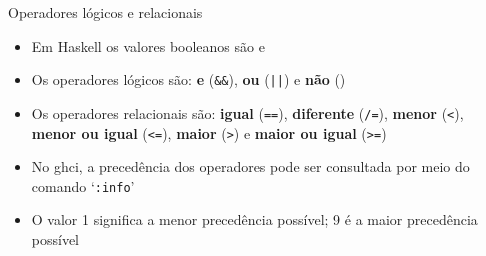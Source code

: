 \begin{frame}[fragile]{Operadores lógicos e relacionais}

    \begin{itemize}
        \item Em Haskell os valores booleanos são  e 

        \item Os operadores lógicos são: \textbf{e} (\texttt{\&\&}), \textbf{ou} (\texttt{||}) e
            \textbf{não} ()

        \item Os operadores relacionais são: \textbf{igual} (\texttt{==}), \textbf{diferente}
            (\texttt{/=}), \textbf{menor} (\texttt{<}), \textbf{menor ou igual} (\texttt{<=}),
            \textbf{maior} (\texttt{>}) e \textbf{maior ou igual} (\texttt{>=})

        \item No ghci, a precedência dos operadores pode ser consultada por meio do comando
            `\texttt{:info}'

        \item O valor 1 significa a menor precedência possível; 9 é a maior precedência possível

        
    \end{itemize}

\end{frame}

